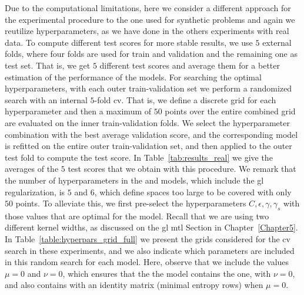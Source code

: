 Due to the computational limitations, here we consider a different approach for the experimental procedure to the one used for synthetic problems and again we reutilize hyperparameters, as we have done in the others experiments with real data.
To compute different test scores for more stable results, we use $5$ external folds, where four folds are used for train and validation and the remaining one as test set.
That is, we get $5$ different test scores and average them for a better estimation of the performance of the models. 
%
For searching the optimal hyperparameters, with each outer train-validation set we perform a randomized search with an internal $5$-fold \acrshort{cv}. That is, we define a discrete grid for each hyperparameter and then a maximum of $50$ points over the entire combined grid are evaluated on the inner train-validation folds.
%
We select the hyperparameter combination with the best average validation score, and the corresponding model is refitted on the entire outer train-validation set, and then applied to the outer test fold to compute the test score. In Table~\ref{tab:results_real} we give the averages of the $5$ test scores that we obtain with this procedure.
%
We remark that the number of hyperparameters in the  and  models, which include the \acrshort{gl} regularization, is $5$ and $6$, which define spaces too large to be covered with only $50$ points. To alleviate this, we first pre-select the hyperparameters $C, \epsilon, \gamma, \gamma_s$ with those values that are optimal for the  model. Recall that we are using two different kernel widths, as discussed on the \acrshort{gl} \acrshort{mtl} Section in Chapter~\ref{Chapter5}.
%
In Table~\ref{table:hyperpars_grid_full} we present the grids considered for the \acrshort{cv} search in these experiments, and we also indicate which parameters are included in this random search for each model.
Here, observe that we include the values $\mu=0$ and $\nu=0$, which ensures that the the  model contains the  one, with $\nu=0$, and also  contains  with an identity matrix (minimal entropy rows) when $\mu=0$.
%

